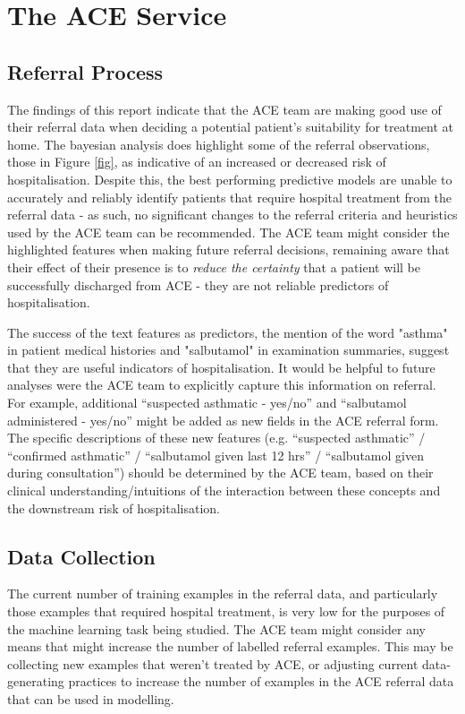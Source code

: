 
\section{The ACE Service}

\subsection{Referral Process}

The findings of this report indicate that the ACE team are making good use of their referral data when deciding a potential patient's suitability for treatment at home. The bayesian analysis does highlight some of the referral observations, those in Figure \ref{fig}, as indicative of an increased or decreased risk of hospitalisation. Despite this, the best performing predictive models are unable to accurately and reliably identify patients that require hospital treatment from the referral data - as such, no significant changes to the referral criteria and heuristics used by the ACE team can be recommended. The ACE team might consider the highlighted features when making future referral decisions, remaining aware that their effect of their presence is to \textit{reduce the certainty} that a patient will be successfully discharged from ACE - they are not reliable predictors of hospitalisation.

The success of the text features as predictors, the mention of the word "asthma" in patient medical histories and "salbutamol" in examination summaries, suggest that they are useful indicators of hospitalisation. It would be helpful to future analyses were the ACE team to explicitly capture this information on referral. For example, additional ``suspected asthmatic - yes/no'' and ``salbutamol administered - yes/no'' might be added as new fields in the ACE referral form. The specific descriptions of these new features (e.g. ``suspected asthmatic'' / ``confirmed asthmatic'' / ``salbutamol given last 12 hrs'' / ``salbutamol given during consultation'') should be determined by the ACE team, based on their clinical understanding/intuitions of the interaction between these concepts and the downstream risk of hospitalisation.

\subsection{Data Collection}

The current number of training examples in the referral data, and particularly those examples that required hospital treatment, is very low for the purposes of the machine learning task being studied. The ACE team might consider any means that might increase the number of labelled referral examples. This may be collecting new examples that weren't treated by ACE, or adjusting current data-generating practices to increase the number of examples in the ACE referral data that can be used in modelling.

